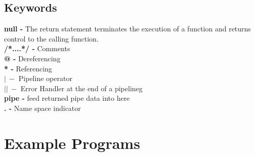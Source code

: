 \documentclass[11pt]{article}
\begin{document}
\subsection{ Keywords}
\begin{adjustwidth}{1cm}{}
\textbf {null -} The return statement terminates the execution of a function and returns control to the calling function.\\
\textbf{/*....*/ - } Comments \\ 
\textbf{@ - } Dereferencing \\ 
\textbf{* -} Referencing\\ 
$\mathbf{\vert \ -}$ Pipeline operator\\ 
$\mathbf{\vert \vert \ -}$  Error Handler at the end of a pipelineg\\
\textbf{pipe -} feed returned pipe data into here\\ 
\textbf{. -} Name space indicator\\
\end{adjustwidth}

\newpage
\section{Example Programs}
\end{document}
